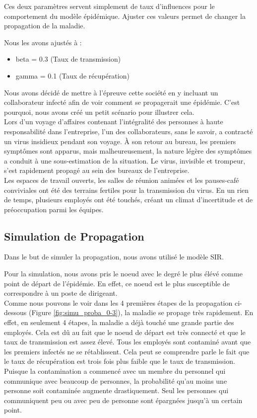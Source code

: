 \documentclass{article}
\begin{document}
Ces deux paramètres servent simplement de taux d'influences pour le comportement du modèle épidémique. Ajuster ces valeurs permet de changer la propagation de la maladie.

Nous les avons ajustés à :
\begin{itemize}
    \item beta = 0.3 (Taux de transmission)
    \item gamma = 0.1 (Taux de récupération)
\end{itemize}


Nous avons décidé de mettre à l'épreuve cette société en y incluant un collaborateur infecté afin de voir comment se propagerait une épidémie. C'est pourquoi, nous avons créé un petit scénario pour illustrer cela. \\

Lors d'un voyage d'affaires contenant l'intégralité des personnes à haute responsabilité dans l'entreprise, l'un des collaborateurs, sans le savoir, a contracté un virus insidieux pendant son voyage. À son retour au bureau, les premiers symptômes sont apparus, mais malheureusement, la nature légère des symptômes a conduit à une sous-estimation de la situation. Le virus, invisible et trompeur, s'est rapidement propagé au sein des bureaux de l'entreprise. \\

Les espaces de travail ouverts, les salles de réunion animées et les pauses-café conviviales ont été des terrains fertiles pour la transmission du virus. En un rien de temps, plusieurs employés ont été touchés, créant un climat d'incertitude et de préoccupation parmi les équipes.

\subsection{Simulation de Propagation}

Dans le but de simuler la propagation, nous avons utilisé le modèle SIR.

Pour la simulation, nous avons pris le noeud avec le degré le plus élévé comme point de départ de l'épidémie. En effet, ce noeud est le plus susceptible de correspondre à un poste de dirigeant. \\

Comme nous pouvons le voir dans les 4 premières étapes de la propagation ci-dessous (Figure \ref{fig:simu_proba_0-3}), la maladie se propage très rapidement. En effet, en seulement 4 étapes, la maladie a déjà touché une grande partie des employés. Cela est dû au fait que le noeud de départ est très connecté et que le taux de transmission est assez élevé. Tous les employés sont contaminé avant que les premiers infectés ne se rétablissent. Cela peut se comprendre parle le fait que le taux de récupération est trois fois plus faible que le taux de transmission. Puisque la contamination a commencé avec un membre du personnel qui communique avec beaucoup de personnes, la probabilité qu'au moins une personne soit contaminée augmente drastiquement. Seul les personnes qui communiquent peu ou avec peu de personne sont épargnées jusqu'à un certain point.
\end{document}
